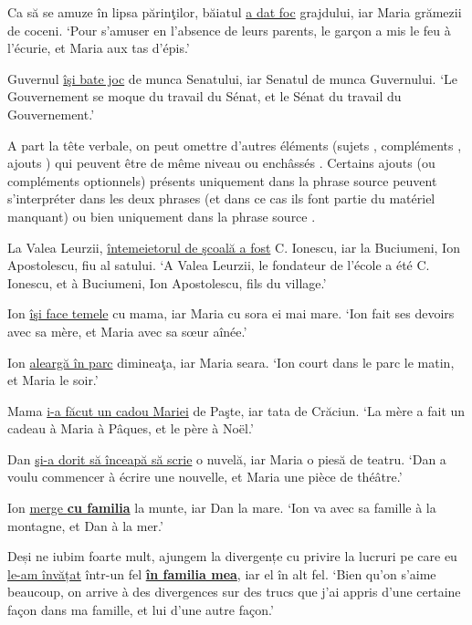 \ea
\ea Ca să se amuze în lipsa părinţilor, băiatul \uline{a dat foc} grajdului, iar Maria grămezii de coceni. \label{ch2:ex80a}
\glt ‘Pour s’amuser en l’absence de leurs parents, le garçon a mis le feu à l’écurie, et Maria aux tas d’épis.’   

\ex Guvernul \uline{îşi bate joc} de munca Senatului, iar Senatul de munca Guvernului. \label{ch2:ex80b}
\glt ‘Le Gouvernement se moque du travail du Sénat, et le Sénat du travail du Gouvernement.’
\z
\z

A part la tête verbale, on peut omettre d’autres éléments (sujets , compléments , ajouts ) qui peuvent être de même niveau  ou enchâssés . Certains ajouts (ou compléments optionnels) présents uniquement dans la phrase source peuvent s’interpréter dans les deux phrases (et dans ce cas ils font partie du matériel manquant) ou bien uniquement dans la phrase source . 

\ea
\ea La Valea Leurzii, \uline{întemeietorul de şcoală a fost} C. Ionescu, iar la Buciumeni, Ion Apostolescu, fiu al satului. \label{ch2:ex81a}
\glt ‘A Valea Leurzii, le fondateur de l’école a été C. Ionescu, et à Buciumeni, Ion Apostolescu, fils du village.’

\ex Ion \uline{îşi face temele} cu mama, iar Maria cu sora ei mai mare. \label{ch2:ex81b}
\glt ‘Ion fait ses devoirs avec sa mère, et Maria avec sa sœur aînée.’   

\ex Ion \uline{aleargă în parc} dimineaţa, iar Maria seara. \label{ch2:ex81c}
\glt ‘Ion court dans le parc le matin, et Maria le soir.’
\z
\z


\ea
\ea Mama \uline{i-a făcut un cadou Mariei} de Paşte, iar tata de Crăciun. \label{ch2:ex82a}
\glt ‘La mère a fait un cadeau à Maria à Pâques, et le père à Noël.’

\ex Dan \uline{şi-a dorit să înceapă să scrie} o nuvelă, iar Maria o piesă de teatru. \label{ch2:ex82b}
\glt ‘Dan a voulu commencer à écrire une nouvelle, et Maria une pièce de théâtre.’
\z
\z

\ea \label{ch2:ex83}
\ea Ion \uline{merge \textbf{cu familia}} la munte, iar Dan la mare.
\glt ‘Ion va avec sa famille à la montagne, et Dan à la mer.’

\ex Deși ne iubim foarte mult, ajungem la divergențe cu privire la lucruri pe care eu \uline{le-am învățat} într-un fel \uline{\textbf{în familia mea}}, iar el în alt fel.
\glt ‘Bien qu’on s’aime beaucoup, on arrive à des divergences sur des trucs que j’ai appris d’une certaine façon dans ma famille, et lui d’une autre façon.’

